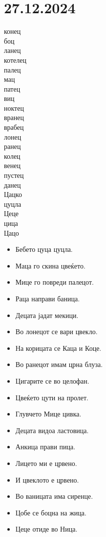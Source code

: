 \documentclass[a5paper,12pt]{article}
\newenvironment{activity}[1]{%
  \begin{tcolorbox}[colback=boxcolor,colframe=titlecolor,title={\textbf{#1}},fonttitle=\bfseries]
}{%
  \end{tcolorbox}
}
\begin{document}
\section{27.12.2024}
\begin{activity}{Зборчиња}
\begin{multicols}{4}
конец\\ боц\\ ланец\\ котелец\\ палец\\ мац\\ патец\\ виц\\ ноктец\\ вранец\\ врабец\\ лонец\\ ранец\\ колец\\ венец\\ пустец\\ данец\\ Цацко\\ цуцла\\ Цеце\\ цица\\ Цацо
\end{multicols}
\end{activity}
\begin{itemize}
  \item Бебето цуца цуцла.
  \item Маца го скина цвеќето.
  \item Мице го повреди палецот.
  \item Раца направи баница.
  \item Децата јадат мекици.
  \item Во лонецот се вари цвекло.
  \item На корицата се Каца и Коце.
  \item Во ранецот имам црна блуза.
  \item Цигарите се во целофан.
  \item Цвеќето цути на пролет.
  \item Глувчето Мице цивка. 
  \item Децата видоа ластовица. 
  \item Анкица прави пица.
  \item Лицето ми е црвено.
  \item И цвеклото е црвено.
  \item Во ваницата има сиренце.
  \item Цобе се боцна на жица.
  \item Цеце отиде во Ница.
\end{itemize}
\end{document}
